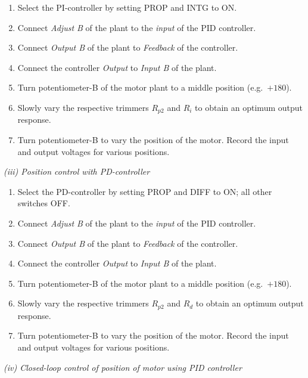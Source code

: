 \begin{procedure}
  \begin{enumerate}
    \item Select the PI-controller by setting PROP and INTG to ON.
    \item Connect \textit{Adjust B} of the plant to the \textit{input} of the PID controller.
    \item Connect \textit{Output B} of the plant to \textit{Feedback} of the controller.
    \item Connect the controller \textit{Output} to \textit{Input B} of the plant.
    \item Turn potentiometer-B of the motor plant to a middle position (e.g.\ $+180$).
    \item Slowly vary the respective trimmers $R_{p2}$ and $R_i$ to obtain an optimum output response.
    \item Turn potentiometer-B to vary the position of the motor. Record the input and output voltages for various positions.
  \end{enumerate}\newpage

  \textit{(iii) Position control with PD-controller}\vspace{2pt}

  \begin{enumerate}
    \item Select the PD-controller by setting PROP and DIFF to ON; all other switches OFF.
    \item Connect \textit{Adjust B} of the plant to the \textit{input} of the PID controller.
    \item Connect \textit{Output B} of the plant to \textit{Feedback} of the controller.
    \item Connect the controller \textit{Output} to \textit{Input B} of the plant.
    \item Turn potentiometer-B of the motor plant to a middle position (e.g.\ $+180$).
    \item Slowly vary the respective trimmers $R_{p2}$ and $R_d$ to obtain an optimum output response.
    \item Turn potentiometer-B to vary the position of the motor. Record the input and output voltages for various positions.
  \end{enumerate}
  \vspace*{1em}

  \textit{(iv) Closed-loop control of position of motor using PID controller}\vspace{2pt}


\end{procedure}
